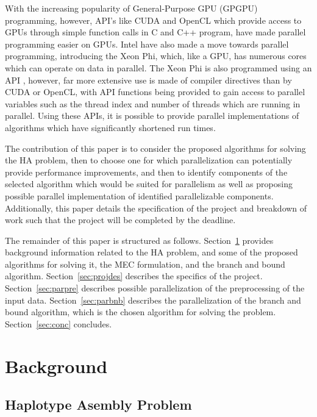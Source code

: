 \documentclass[10pt,twocolumn]{article}
\begin{document}
With the increasing popularity of General-Purpose GPU (GPGPU) programming, however, API's like CUDA
\cite{nvidia:2015} and OpenCL \cite{khronos:2015}
which provide access to GPUs through simple function calls in C and C++ program, have made parallel programming
easier on GPUs. Intel have also made a move towards parallel programming, introducing the Xeon Phi, which, like 
a GPU, has numerous cores which can operate on data in parallel. The Xeon Phi is also programmed using an API 
\cite{intel:2013}, however, far more extensive use is made of compiler directives than by CUDA or OpenCL, 
with API functions being provided to gain access to parallel variables such as the thread index and number of 
threads which are running in parallel. Using these APIs, it is possible to provide parallel implementations of
algorithms which have significantly shortened run times.

The contribution of this paper is to consider the proposed algorithms for solving the HA problem, then to
choose one for which parallelization can potentially provide performance improvements, and then to identify 
components of the selected algorithm which would be suited for parallelism as well as proposing possible 
parallel implementation of identified parallelizable components. Additionally, this paper details the
specification of the project and breakdown of work such that the project will be completed by the deadline.

The remainder of this paper is structured as follows. Section~\ref{sec:bground} provides background
information related to the HA problem, and some of the proposed algorithms for solving it, the MEC
formulation, and the branch and bound algorithm. Section~\ref{sec:projdes} describes the specifics of the
project. Section~\ref{sec:parpre} describes possible parallelization of the preprocessing of the input data. 
Section~\ref{sec:parbnb} describes the parallelization of the branch and bound algorithm, which is the chosen
algorithm for solving the problem. Section~\ref{sec:conc} concludes.


\section{Background} \label{sec:bground}

\subsection{Haplotype Asembly Problem} \label{sec:hap}
\end{document}
